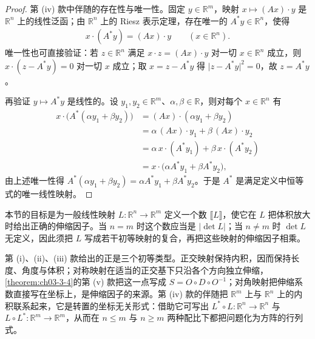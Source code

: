 \documentclass[../../main.tex]{subfiles}%
\begin{document}
\begin{proof}
第 (iv) 款中伴随的存在性与唯一性。固定 $y\in\mathbb{R}^m$，映射 $x\mapsto(Ax)\cdot y$ 是 $\mathbb{R}^n$ 上的线性泛函；由 $\mathbb{R}^n$ 上的 Riesz 表示定理，存在唯一的 $A^*y\in\mathbb{R}^n$，使得
\begin{align*}
x\cdot(A^*y)=(Ax)\cdot y\qquad(x\in\mathbb{R}^n).
\end{align*}
唯一性也可直接验证：若 $z\in\mathbb{R}^n$ 满足 $x\cdot z=(Ax)\cdot y$ 对一切 $x\in\mathbb{R}^n$ 成立，则 $x\cdot(z-A^*y)=0$ 对一切 $x$ 成立；取 $x=z-A^*y$ 得 $\lvert z-A^*y\rvert^2=0$，故 $z=A^*y$。

再验证 $y\mapsto A^*y$ 是线性的。设 $y_1,y_2\in\mathbb{R}^m$、$\alpha,\beta\in\mathbb{R}$，则对每个 $x\in\mathbb{R}^n$ 有
\begin{align*}
x\cdot\bigl(A^*(\alpha y_1+\beta y_2)\bigr)
&=(Ax)\cdot(\alpha y_1+\beta y_2)\\
&=\alpha\,(Ax)\cdot y_1+\beta\,(Ax)\cdot y_2\\
&=\alpha\,x\cdot(A^*y_1)+\beta\,x\cdot(A^*y_2)\\
&=x\cdot\bigl(\alpha A^*y_1+\beta A^*y_2\bigr),
\end{align*}
由上述唯一性得 $A^*(\alpha y_1+\beta y_2)=\alpha A^*y_1+\beta A^*y_2$。于是 $A^*$ 是满足定义中恒等式的唯一线性映射。
\end{proof}

\begin{remark}\label{remark:ch03-def-3-3-动机}
本节的目标是为一般线性映射 $L:\mathbb{R}^n\to\mathbb{R}^m$ 定义一个数 $\llbracket L\rrbracket$，使它在 $L$ 把体积放大时给出正确的伸缩因子。当 $n=m$ 时这个数应当是 $\lvert\det L\rvert$；当 $n\neq m$ 时 $\det L$ 无定义，因此须把 $L$ 写成若干初等映射的复合，再把这些映射的伸缩因子相乘。

第 (i)、(ii)、(iii) 款给出的正是三个初等类型。正交映射保持内积，因而保持长度、角度与体积；对称映射在适当的正交基下只沿各个方向独立伸缩，\cref{theorem:ch03-3-4}的第 (v) 款把这一点写成 $S=O\circ D\circ O^{-1}$；对角映射把伸缩系数直接写在坐标上，是伸缩因子的来源。第 (iv) 款的伴随把 $\mathbb{R}^m$ 上与 $\mathbb{R}^n$ 上的内积联系起来，它是转置的坐标无关形式：借助它可写出 $L^*\circ L:\mathbb{R}^n\to\mathbb{R}^n$ 与 $L\circ L^*:\mathbb{R}^m\to\mathbb{R}^m$，从而在 $n\leqslant m$ 与 $n\geqslant m$ 两种配比下都把问题化为方阵的行列式。%
\end{remark}
\end{document}
